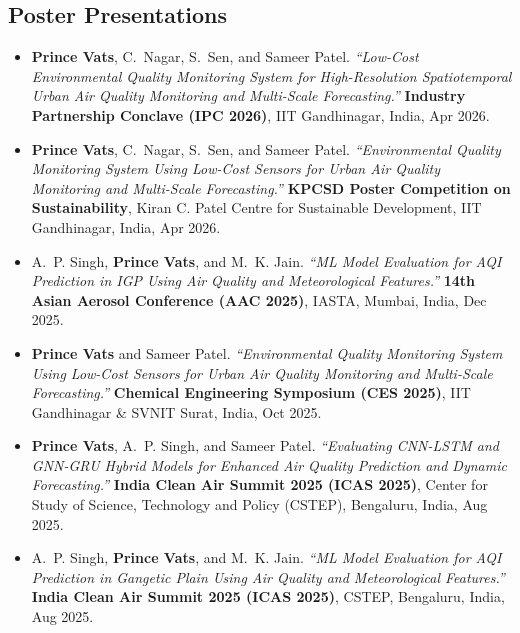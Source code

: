 \documentclass[10pt,a4paper]{article}
\begin{document}
\subsection*{Poster Presentations}
\begin{itemize}
    \item \textbf{Prince Vats}, C.~Nagar, S.~Sen, and Sameer Patel. \textit{``Low-Cost Environmental Quality Monitoring System for High-Resolution Spatiotemporal Urban Air Quality Monitoring and Multi-Scale Forecasting.''} \textbf{Industry Partnership Conclave (IPC 2026)}, IIT Gandhinagar, India, Apr 2026.
    \item \textbf{Prince Vats}, C.~Nagar, S.~Sen, and Sameer Patel. \textit{``Environmental Quality Monitoring System Using Low-Cost Sensors for Urban Air Quality Monitoring and Multi-Scale Forecasting.''} \textbf{KPCSD Poster Competition on Sustainability}, Kiran C. Patel Centre for Sustainable Development, IIT Gandhinagar, India, Apr 2026.
    \item A.~P. Singh, \textbf{Prince Vats}, and M.~K. Jain. \textit{``ML Model Evaluation for AQI Prediction in IGP Using Air Quality and Meteorological Features.''} \textbf{14th Asian Aerosol Conference (AAC 2025)}, IASTA, Mumbai, India, Dec 2025.
    \item \textbf{Prince Vats} and Sameer Patel. \textit{``Environmental Quality Monitoring System Using Low-Cost Sensors for Urban Air Quality Monitoring and Multi-Scale Forecasting.''} \textbf{Chemical Engineering Symposium (CES 2025)}, IIT Gandhinagar \& SVNIT Surat, India, Oct 2025.
    \item \textbf{Prince Vats}, A.~P. Singh, and Sameer Patel. \textit{``Evaluating CNN-LSTM and GNN-GRU Hybrid Models for Enhanced Air Quality Prediction and Dynamic Forecasting.''} \textbf{India Clean Air Summit 2025 (ICAS 2025)}, Center for Study of Science, Technology and Policy (CSTEP), Bengaluru, India, Aug 2025.
    \item A.~P. Singh, \textbf{Prince Vats}, and M.~K. Jain. \textit{``ML Model Evaluation for AQI Prediction in Gangetic Plain Using Air Quality and Meteorological Features.''} \textbf{India Clean Air Summit 2025 (ICAS 2025)}, CSTEP, Bengaluru, India, Aug 2025.
\end{itemize}

\end{document}
